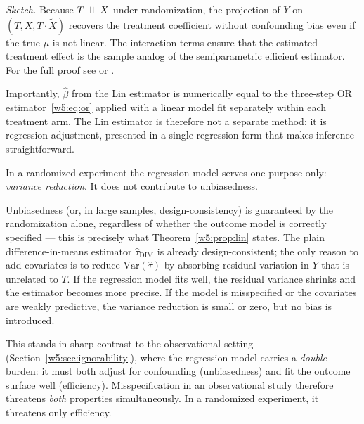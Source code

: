 \documentclass[master.tex]{subfiles}
\begin{document}
\noindent\textit{Sketch.}  Because $T \perp\!\!\!\perp X$ under randomization,
the projection of $Y$ on $(T, X, T \cdot \tilde{X})$ recovers the
treatment coefficient without confounding bias even if the true $\mu$
is not linear.  The interaction terms ensure that the estimated
treatment effect is the sample analog of the semiparametric efficient
estimator.  For the full proof see \citet{lin2013agnostic} or
\citet{freedman2008regression}.

Importantly, $\hat\beta$ from the Lin estimator is numerically
equal to the three-step OR estimator~\eqref{w5:eq:or} applied with a
linear model fit separately within each treatment arm.  The Lin
estimator is therefore not a separate method: it is regression
adjustment, presented in a single-regression form that makes inference
straightforward.

\begin{remark}
\label{w5:rem:reg-role}
In a randomized experiment the regression model serves one purpose
only: \emph{variance reduction}.  It does not contribute to
unbiasedness.

Unbiasedness (or, in large samples, design-consistency) is guaranteed
by the randomization alone, regardless of whether the outcome model is
correctly specified --- this is precisely what Theorem~\ref{w5:prop:lin}
states.  The plain difference-in-means estimator $\hat\tau_{\mathrm{DIM}}$
is already design-consistent; the only reason to add covariates is to
reduce $\mathrm{Var}(\hat\tau)$ by absorbing residual variation in $Y$
that is unrelated to $T$.  If the regression model fits well, the
residual variance shrinks and the estimator becomes more precise.  If
the model is misspecified or the covariates are weakly predictive, the
variance reduction is small or zero, but no bias is introduced.

This stands in sharp contrast to the observational setting
(Section~\ref{w5:sec:ignorability}), where the regression model
carries a \emph{double} burden: it must both adjust for confounding
(unbiasedness) and fit the outcome surface well (efficiency).
Misspecification in an observational study therefore threatens
\emph{both} properties simultaneously.  In a randomized experiment, it
threatens only efficiency.
\end{remark}
\end{document}

